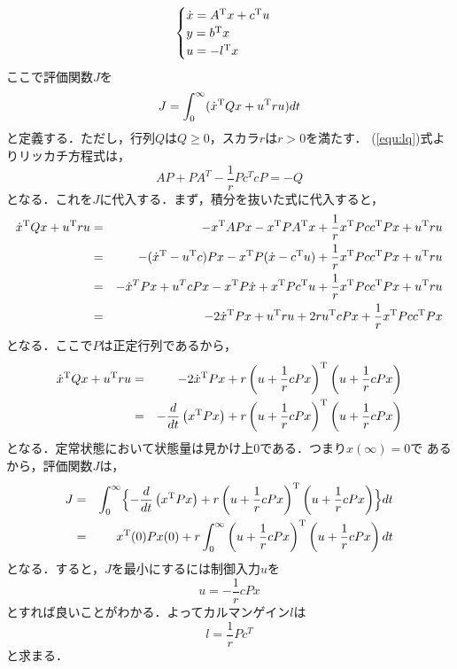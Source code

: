 \documentclass[a4paper,12pt]{jarticle}
\begin{document}
\begin{eqnarray}\label{equ:lq}
 \begin{cases}
  \dot{x} = A^{\rm{T}}x+c^{\rm{T}}u & \\
  y = b^{\rm{T}}x & \\
  u = -l^{\rm{T}}x
 \end{cases}
\end{eqnarray}
ここで評価関数$J$を
\begin{equation}
 J  = \int_0^\infty (\dot{x}^{\rm{T}} Q x + u^{\rm{T}}ru) dt
\end{equation}
と定義する．ただし，行列$Q$は$Q \geq 0$，スカラ$r$は$r>0$を満たす．
(\ref{equ:lq})式よりリッカチ方程式は，
\begin{equation}
 AP + PA^T -\frac{1}{r}Pc^TcP = -Q 
\end{equation}
となる．これを$J$に代入する．まず，積分を抜いた式に代入すると，
\begin{eqnarray}
 \dot{x}^{\rm{T}} Q x + u^{\rm{T}} ru & = & -x^{\rm{T}}APx-x^{\rm{T}}PA^{\rm{T}}x+\frac{1}{r}x^{\rm{T}}Pcc^{\rm{T}}Px+u^{\rm{T}}ru \\
 & = & -(\dot{x}^{\rm{T}} -
  u^{\rm{T}}c)Px-x^{\rm{T}}P(\dot{x}-c^{\rm{T}}u)+\frac{1}{r}x^{\rm{T}}Pcc^{\rm{T}}Px+u^{\rm{T}}ru \\
 & = & -\dot{x}^T Px + u^T cPx -x^{\rm{T}}P\dot{x} + x^{\rm{T}}
  Pc^{\rm{T}}u + \frac{1}{r}x^{\rm{T}}Pcc^{\rm{T}}Px+u^{\rm{T}}ru \\
 & = & -2 \dot{x}^{\rm{T}}Px + u^{\rm{T}}ru + 2ru^{\rm{T}}cPx + \frac{1}{r}x^{\rm{T}}Pcc^{\rm{T}}Px
\end{eqnarray}
となる．ここで$P$は正定行列であるから，
\begin{eqnarray}
 \dot{x}^{\rm{T}} Q x + u^{\rm{T}} ru & = &  -2 \dot{x}^{\rm{T}}Px +
  r \left(u+\frac{1}{r}cPx \right)^{\rm{T}} \left(u+\frac{1}{r}cPx \right) \\
 & = & - \frac{d}{dt} \left(x^{\rm{T}} Px \right)+ r \left(u+\frac{1}{r}cPx \right)^{\rm{T}} \left(u+\frac{1}{r}cPx \right)
\end{eqnarray}
となる．定常状態において状態量は見かけ上$0$である．つまり$x(\infty)=0$で
あるから，評価関数$J$は，
\begin{eqnarray}
 J & = & \int_0^\infty  \Bigl\{ -\frac{d}{dt} \left(x^{\rm{T}}Px \right) +  r \left(u+\frac{1}{r}cPx \right)^{\rm{T}}
  \left(u+\frac{1}{r}cPx \right) \Bigr\} dt\\
 & = &  x^{\rm{T}}(0)Px(0)  + r \int_0^\infty \left(u+\frac{1}{r}cPx \right)^{\rm{T}}
  \left(u+\frac{1}{r}cPx \right)  dt
\end{eqnarray}
となる．すると，$J$を最小にするには制御入力$u$を
\begin{equation}
 u = - \frac{1}{r}cPx
\end{equation}
とすれば良いことがわかる．よってカルマンゲイン$l$は
\begin{equation}
 l = \frac{1}{r}Pc^T
\end{equation}
と求まる．
\end{document}
